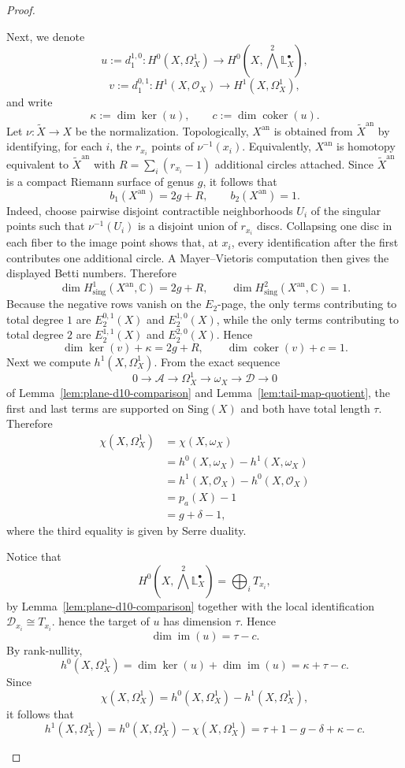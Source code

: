 \documentclass[12pt,reqno]{amsart}
\begin{document}
\begin{proof}
\begin{enumerate}
Next, we denote 
\[
u:=d_1^{1,0}:H^0(X,\Omega_X^1)\to H^0\!\left(X,\bigwedge^2\mathbb{L}^{\bullet}_X\right),
\]
\[
v:=d_1^{0,1}:H^1(X,\mathcal O_X)\to H^1(X,\Omega_X^1),
\]
and write
\[
\kappa:=\dim \ker(u),
\qquad
c:=\dim \operatorname{coker}(u).
\]
Let \(\nu:\widetilde X\to X\) be the normalization. Topologically, \(X^{\mathrm{an}}\) is obtained from \(\widetilde X^{\mathrm{an}}\) by identifying, for each \(i\), the \(r_{x_i}\) points of \(\nu^{-1}(x_i)\). Equivalently, \(X^{\mathrm{an}}\) is homotopy equivalent to \(\widetilde X^{\mathrm{an}}\) with \(R=\sum_i(r_{x_i}-1)\) additional circles attached. Since \(\widetilde X^{\mathrm{an}}\) is a compact Riemann surface of genus \(g\), it follows that
\[
b_1(X^{\mathrm{an}})=2g+R,
\qquad
b_2(X^{\mathrm{an}})=1.
\]
Indeed, choose pairwise disjoint contractible neighborhoods \(U_i\) of the singular points such that \(\nu^{-1}(U_i)\) is a disjoint union of \(r_{x_i}\) discs. Collapsing one disc in each fiber to the image point shows that, at \(x_i\), every identification after the first contributes one additional circle.
A Mayer--Vietoris computation then gives the displayed Betti numbers.
Therefore
\[
\dim H^1_{\mathrm{sing}}(X^{\mathrm{an}},\mathbb C)=2g+R,
\qquad
\dim H^2_{\mathrm{sing}}(X^{\mathrm{an}},\mathbb C)=1.
\]
Because the negative rows vanish on the \(E_2\)-page, the only terms contributing to total degree \(1\) are \(E_2^{0,1}(X)\) and \(E_2^{1,0}(X)\), while the only terms contributing to total degree \(2\) are \(E_2^{1,1}(X)\) and \(E_2^{2,0}(X)\). Hence
\[
\dim \ker(v)+\kappa=2g+R,
\qquad
\dim \operatorname{coker}(v)+c=1.
\]
Next we compute \(h^1(X,\Omega_X^1)\). From the exact sequence
\[
0\to \mathcal A\to \Omega_X^1\to \omega_X\to \mathcal D\to 0
\]
of Lemma~\ref{lem:plane-d10-comparison} and Lemma~\ref{lem:tail-map-quotient}, the first and last terms are supported on \(\mathrm{Sing}(X)\) and both have total length \(\tau\). Therefore
\[
\begin{aligned}
\chi(X,\Omega_X^1)
&=\chi(X,\omega_X)\\
&=h^0(X,\omega_X)-h^1(X,\omega_X)\\
&=h^1(X,\mathcal O_X)-h^0(X,\mathcal O_X)\\
&=p_a(X)-1\\
&=g+\delta-1,
\end{aligned}
\]
where the third equality is given by Serre duality.

Notice that
\[
H^0\!\left(X,\bigwedge^2\mathbb{L}^{\bullet}_X\right)=\bigoplus_i T_{x_i},
\]
by Lemma~\ref{lem:plane-d10-comparison} together with the local identification
\(\mathcal D_{x_i}\cong T_{x_i}\).
hence the target of \(u\) has dimension \(\tau\). Hence
\[
\dim \operatorname{im}(u)=\tau-c.
\]
By rank-nullity,
\[
h^0(X,\Omega_X^1)=\dim \ker(u)+\dim \operatorname{im}(u)=\kappa+\tau-c.
\]
Since
\[
\chi(X,\Omega_X^1)=h^0(X,\Omega_X^1)-h^1(X,\Omega_X^1),
\]
it follows that
\[
h^1(X,\Omega_X^1)=h^0(X,\Omega_X^1)-\chi(X,\Omega_X^1)
=\tau+1-g-\delta+\kappa-c.
\]


\end{enumerate}
\end{proof}
\end{document}

